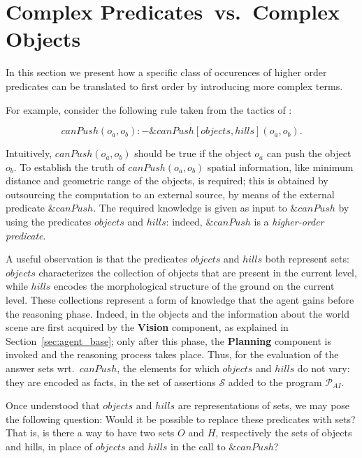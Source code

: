 \section{Complex Predicates~vs.~Complex Objects}
\label{sec:main}

In this section we present how a specific class of occurences of higher order predicates can be translated to first order by introducing more complex terms.

For example, consider the following rule taken from the tactics of \ah:

$$ canPush(o_a,o_b) :- \&canPush[objects,hills](o_a,o_b). \label{main:rule-1} $$

Intuitively, $canPush(o_a, o_b)$ should be true if the object $o_a$ can push the object $o_b$.
To establish the truth of $canPush(o_a, o_b)$ spatial information, like minimum distance and geometric range of the objects, is required; this is obtained by outsourcing the computation to an external source, by means of the external predicate $\&canPush$.
The required knowledge is given as input to $\&canPush$ by using the predicates $objects$ and $hills$: indeed, $\&canPush$ is a \emph{higher-order predicate}.

A useful observation is that the predicates $objects$ and $hills$ both represent sets: $objects$ characterizes the collection of objects that are present in the current level, while $hills$ encodes the morphological structure of the ground on the current level.
These collections represent a form of knowledge that the agent gains before the reasoning phase.
Indeed, in \ah the objects and the information about the world scene are first acquired by the \textbf{Vision} component, as explained in Section~\ref{sec:agent_base}; only after this phase, the \textbf{Planning} component is invoked and the reasoning process takes place.
Thus, for the evaluation of the answer sets wrt.~$canPush$, the elements for which $objects$ and $hills$ do not vary: they are encoded as facts, in the set of assertions \(\mathcal{S}\) added to the program \(\mathcal{P}_{AI}\).

Once understood that $objects$ and $hills$ are representations of sets, we may pose the following question: Would it be possible to replace these predicates with sets?
That is, is there a way to have two sets $O$ and $H$, respectively the sets of objects and hills, in place of  $objects$ and $hills$ in the call to $\&canPush$?

